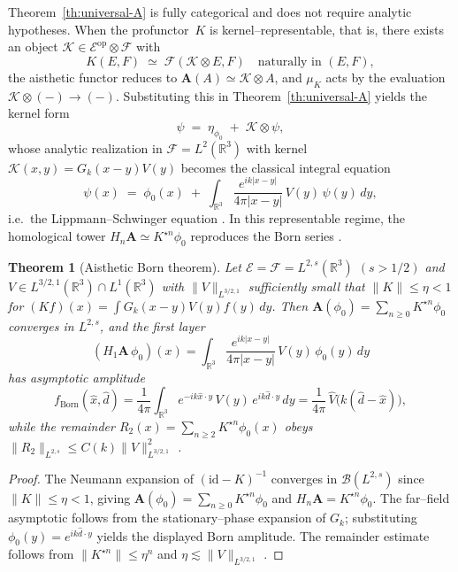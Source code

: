 \documentclass[12pt]{article}
\newcommand{\E}{\mathcal{E}}
\newcommand{\F}{\mathcal{F}}
\newcommand{\op}{\mathrm{op}}
\theoremstyle{plain}
\newtheorem{theorem}{Theorem}[section]
\theoremstyle{definition}
\theoremstyle{remark}
\numberwithin{equation}{section}
\begin{document}
Theorem~\ref{th:universal-A} is fully categorical and does not require analytic hypotheses.  When the profunctor~$K$ is kernel--representable, that is, there exists an object $\mathcal K\in\E^{\op}\!\otimes\!\F$ with
\[
K(E,F)\;\simeq\;\F(\mathcal K\otimes E,F)
\quad\text{naturally in }(E,F),
\]
the aisthetic functor reduces to $\mathbf A(A)\simeq\mathcal K\otimes A$, and $\mu_K$ acts by the evaluation $\mathcal K\otimes(-)\to(-)$.  Substituting this in Theorem~\ref{th:universal-A} yields the kernel form
\[
\psi\;=\;\eta_{\phi_0}\;+\;\mathcal K\otimes\psi,
\]
whose analytic realization in $\F=L^2(\mathbb R^3)$ with kernel
$\mathcal K(x,y)=G_k(x-y)V(y)$ becomes the classical integral equation
\[
\psi(x)\;=\;\phi_0(x)\;+\;\int_{\mathbb R^3}\frac{e^{ik|x-y|}}{4\pi|x-y|}\,V(y)\,\psi(y)\,dy,
\]
i.e.\ the Lippmann--Schwinger equation \cite{LippmannSchwinger1950,ReedSimonIII}.
In this representable regime, the homological tower $H_n\mathbf A\simeq K^{\star n}\phi_0$ reproduces the Born series 
\cite{Born1926,ColtonKress2013,KirschGrinberg2008}.  

\begin{theorem}[Aisthetic Born theorem]\label{th:aisthetic-born}
Let $\E=\F=L^{2,s}(\mathbb R^3)$ $(s>1/2)$ and $V\in L^{3/2,1}(\mathbb R^3)\cap L^1(\mathbb R^3)$ with $\|V\|_{L^{3/2,1}}$ sufficiently small that $\|K\|\le\eta<1$ for 
$(Kf)(x)=\int G_k(x-y)V(y)f(y)\,dy$.  Then $\mathbf A(\phi_0)=\sum_{n\ge0}K^{\star n}\phi_0$ converges in $L^{2,s}$, and the first layer
\[
(H_1\mathbf A\,\phi_0)(x)
=\int_{\mathbb R^3}\!\frac{e^{ik|x-y|}}{4\pi|x-y|}\,V(y)\,\phi_0(y)\,dy
\]
has asymptotic amplitude
\[
f_{\mathrm{Born}}(\hat x,\hat d)
=\frac{1}{4\pi}\!\int_{\mathbb R^3}\!e^{-ik\hat x\cdot y}\,V(y)\,e^{ik\hat d\cdot y}\,dy
=\frac{1}{4\pi}\,\widehat V\!\big(k(\hat d-\hat x)\big),
\]
while the remainder $R_2(x)=\sum_{n\ge2}K^{\star n}\phi_0(x)$ obeys 
$\|R_2\|_{L^{2,s}}\le C(k)\|V\|_{L^{3/2,1}}^2$
\cite{Agmon1975,IkebeSaito1968,ReedSimonIII}.
\end{theorem}

\begin{proof}
The Neumann expansion of $(\mathrm{id}-K)^{-1}$ converges in $\mathcal B(L^{2,s})$ since $\|K\|\le\eta<1$, giving $\mathbf A(\phi_0)=\sum_{n\ge0}K^{\star n}\phi_0$ and $H_n\mathbf A=K^{\star n}\phi_0$.  
The far--field asymptotic follows from the stationary--phase expansion of $G_k$; substituting $\phi_0(y)=e^{ik\hat d\cdot y}$ yields the displayed Born amplitude.  The remainder estimate follows from $\|K^{\star n}\|\le\eta^n$ and $\eta\lesssim\|V\|_{L^{3/2,1}}$ \cite{ColtonKress2013,ReedSimonIII}.
\end{proof}
\end{document}
